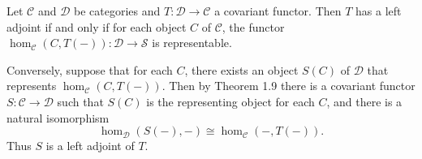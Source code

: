 Let $\mathcal{C}$ and $\mathcal{D}$ be categories and $T : \mathcal{D} \to \mathcal{C}$ a covariant functor. Then $T$ has a left adjoint if and only if for each object $C$ of $\mathcal{C}$, the functor $\hom_{\mathcal{C}}(C, T(-)) : \mathcal{D} \to \mathcal{S}$ is representable.

Conversely, suppose that for each $C$, there exists an object $S(C)$ of $\mathcal{D}$ that represents $\hom_{\mathcal{C}}(C, T(-))$. Then by Theorem 1.9 there is a covariant functor $S : \mathcal{C} \to \mathcal{D}$ such that $S(C)$ is the representing object for each $C$, and there is a natural isomorphism
\[
\hom_{\mathcal{D}}(S(-), -) \cong \hom_{\mathcal{C}}(-, T(-)).
\]
Thus $S$ is a left adjoint of $T$.
